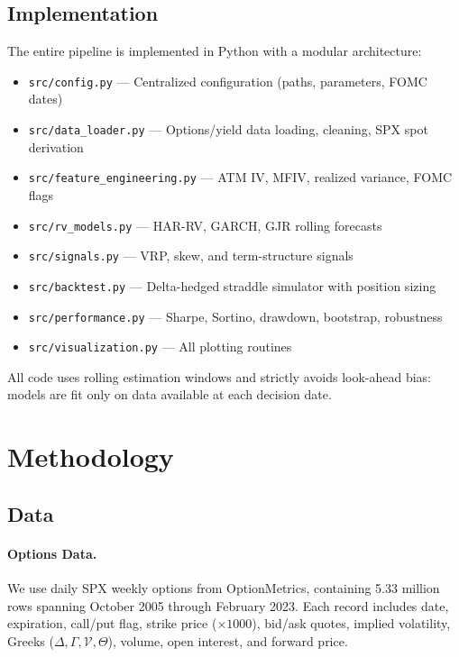 \documentclass[11pt,a4paper]{article}
\begin{document}
\subsection{Implementation}

The entire pipeline is implemented in Python with a modular architecture:
\begin{itemize}[nosep]
    \item \texttt{src/config.py} --- Centralized configuration (paths, parameters, FOMC dates)
    \item \texttt{src/data\_loader.py} --- Options/yield data loading, cleaning, SPX spot derivation
    \item \texttt{src/feature\_engineering.py} --- ATM IV, MFIV, realized variance, FOMC flags
    \item \texttt{src/rv\_models.py} --- HAR-RV, GARCH, GJR rolling forecasts
    \item \texttt{src/signals.py} --- VRP, skew, and term-structure signals
    \item \texttt{src/backtest.py} --- Delta-hedged straddle simulator with position sizing
    \item \texttt{src/performance.py} --- Sharpe, Sortino, drawdown, bootstrap, robustness
    \item \texttt{src/visualization.py} --- All plotting routines
\end{itemize}
All code uses rolling estimation windows and strictly avoids look-ahead bias: models are fit only on data available at each decision date.


\section{Methodology}

\subsection{Data}

\paragraph{Options Data.}
We use daily SPX weekly options from OptionMetrics, containing 5.33 million rows spanning October 2005 through February 2023.
Each record includes date, expiration, call/put flag, strike price ($\times 1000$), bid/ask quotes, implied volatility, Greeks ($\Delta, \Gamma, \mathcal{V}, \Theta$), volume, open interest, and forward price.
\end{document}
